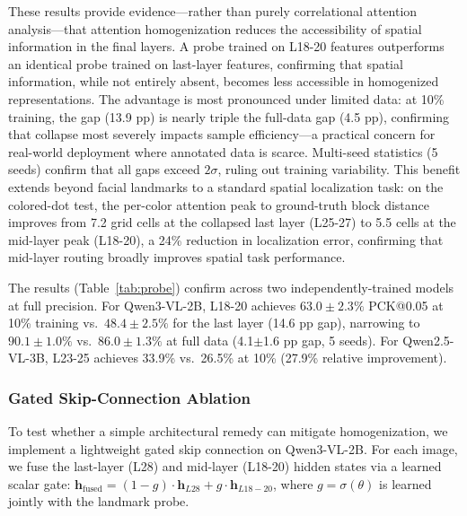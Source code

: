 \documentclass[10pt,twocolumn,letterpaper]{article}
\begin{document}
These results provide evidence---rather than purely correlational attention analysis---that attention homogenization reduces the accessibility of spatial information in the final layers. A probe trained on L18-20 features outperforms an identical probe trained on last-layer features, confirming that spatial information, while not entirely absent, becomes less accessible in homogenized representations. The advantage is most pronounced under limited data: at 10\% training, the gap (13.9 pp) is nearly triple the full-data gap (4.5 pp), confirming that collapse most severely impacts sample efficiency---a practical concern for real-world deployment where annotated data is scarce. Multi-seed statistics (5 seeds) confirm that all gaps exceed $2\sigma$, ruling out training variability. This benefit extends beyond facial landmarks to a standard spatial localization task: on the colored-dot test, the per-color attention peak to ground-truth block distance improves from 7.2 grid cells at the collapsed last layer (L25-27) to 5.5 cells at the mid-layer peak (L18-20), a 24\% reduction in localization error, confirming that mid-layer routing broadly improves spatial task performance.

The results (Table~\ref{tab:probe}) confirm across two independently-trained models at full precision. For Qwen3-VL-2B, L18-20 achieves $63.0\pm2.3\%$ PCK@0.05 at 10\% training vs.\ $48.4\pm2.5\%$ for the last layer (14.6 pp gap), narrowing to $90.1\pm1.0\%$ vs.\ $86.0\pm1.3\%$ at full data (4.1$\pm$1.6 pp gap, 5 seeds). For Qwen2.5-VL-3B, L23-25 achieves 33.9\% vs.\ 26.5\% at 10\% (27.9\% relative improvement).

\subsubsection{Gated Skip-Connection Ablation}
\label{sec:gate}

To test whether a simple architectural remedy can mitigate homogenization, we implement a lightweight gated skip connection on Qwen3-VL-2B. For each image, we fuse the last-layer (L28) and mid-layer (L18-20) hidden states via a learned scalar gate: $\mathbf{h}_{\text{fused}} = (1-g)\cdot\mathbf{h}_{L28} + g\cdot\mathbf{h}_{L18-20}$, where $g=\sigma(\theta)$ is learned jointly with the landmark probe.
\end{document}
